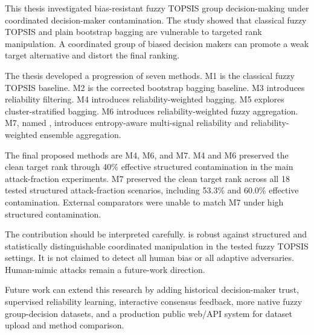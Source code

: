 This thesis investigated bias-resistant fuzzy TOPSIS group decision-making under coordinated decision-maker contamination. The study showed that classical fuzzy TOPSIS and plain bootstrap bagging are vulnerable to targeted rank manipulation. A coordinated group of biased decision makers can promote a weak target alternative and distort the final ranking.

The thesis developed a progression of seven methods. M1 is the classical fuzzy TOPSIS baseline. M2 is the corrected bootstrap bagging baseline. M3 introduces reliability filtering. M4 introduces reliability-weighted bagging. M5 explores cluster-stratified bagging. M6 introduces reliability-weighted fuzzy aggregation. M7, named \methodname, introduces entropy-aware multi-signal reliability and reliability-weighted ensemble aggregation.

The final proposed methods are M4, M6, and M7. M4 and M6 preserved the clean target rank through 40\% effective structured contamination in the main attack-fraction experiments. M7 preserved the clean target rank across all 18 tested structured attack-fraction scenarios, including 53.3\% and 60.0\% effective contamination. External comparators were unable to match M7 under high structured contamination.

The contribution should be interpreted carefully. \methodname{} is robust against structured and statistically distinguishable coordinated manipulation in the tested fuzzy TOPSIS settings. It is not claimed to detect all human bias or all adaptive adversaries. Human-mimic attacks remain a future-work direction.

Future work can extend this research by adding historical decision-maker trust, supervised reliability learning, interactive consensus feedback, more native fuzzy group-decision datasets, and a production public web/API system for dataset upload and method comparison.
